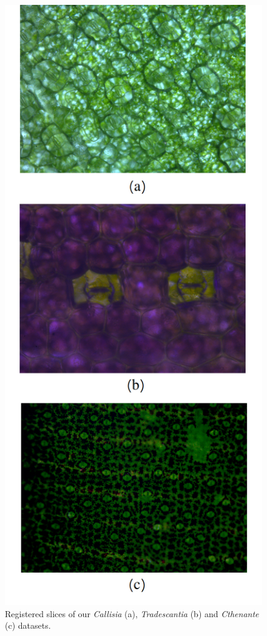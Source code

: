 \begin{figure}[ht]
    \centering
    \caption{Registered slices of our \textit{Callisia} (a), \textit{Tradescantia} (b) and \textit{Cthenante} (c) datasets.}
    \label{fig:registered_slices}
    \includegraphics[scale=.32]{images/middle_images.png} \centering
    \fautor
\end{figure}

